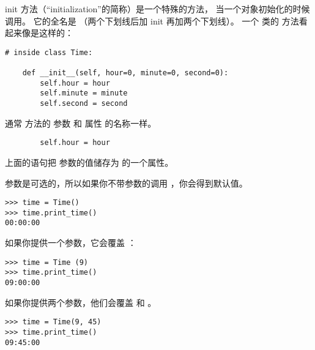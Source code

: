 init 方法（``initialization''的简称）是一个特殊的方法，
当一个对象初始化的时候调用。
它的全名是  （两个下划线后加 init 再加两个下划线）。
一个  类的  方法看起来像是这样的：

\begin{lstlisting}
# inside class Time:

    def __init__(self, hour=0, minute=0, second=0):
        self.hour = hour
        self.minute = minute
        self.second = second
\end{lstlisting}

%

通常  方法的 参数 和 属性 的名称一样。


\begin{lstlisting}
        self.hour = hour
\end{lstlisting}

%

上面的语句把  参数的值储存为  的一个属性。
  
  


参数是可选的，所以如果你不带参数的调用  ，你会得到默认值。

\begin{lstlisting}
>>> time = Time()
>>> time.print_time()
00:00:00
\end{lstlisting}

%

如果你提供一个参数，它会覆盖  ：

\begin{lstlisting}
>>> time = Time (9)
>>> time.print_time()
09:00:00
\end{lstlisting}

%

如果你提供两个参数，他们会覆盖  和  。

\begin{lstlisting}
>>> time = Time(9, 45)
>>> time.print_time()
09:45:00
\end{lstlisting}

